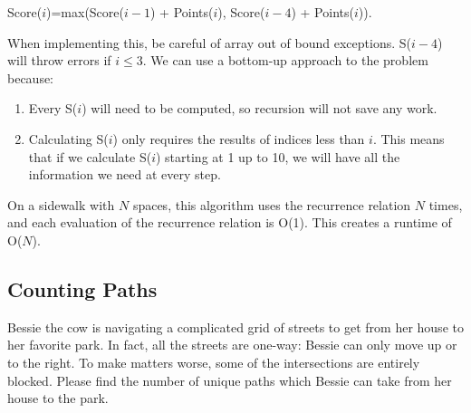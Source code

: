 \documentclass[11pt]{article}
\begin{document}
Score($i$)=max(Score($i-1$) + Points($i$), Score($i-4$) + Points($i$)).
\newline

When implementing this, be careful of array out of bound exceptions.  S($i-4$) will throw errors if $i\leq3$.
We can use a bottom-up approach to the problem because:
\begin{enumerate}
    \item Every S($i$) will need to be computed, so recursion will not save any work.
    \item Calculating S($i$) only requires the results of indices less than $i$.  This means that if we calculate S($i$) starting at 1 up to 10, we will have all the information we need at every step.
\end{enumerate}

On a sidewalk with $N$ spaces, this algorithm uses the recurrence relation $N$ times, and each evaluation of the recurrence relation is O(1).  This creates a runtime of O($N$).

\subsection{Counting Paths}

Bessie the cow is navigating a complicated grid of streets to get from her house to her favorite park.  In fact, all the streets are one-way: Bessie can only move up or to the right.  To make matters worse, some of the intersections are entirely blocked.  Please find the number of unique paths which Bessie can take from her house to the park.

\begin{figure}[h]
\centering
{
}
\end{figure}
\end{document}
